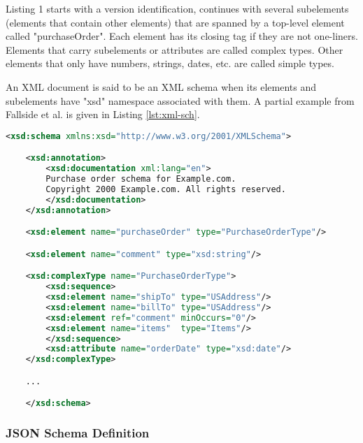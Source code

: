 Listing 1 starts with a version identification, continues with several
subelements (elements that contain other elements) that are spanned by a
top-level element called "purchaseOrder". Each element has its closing tag if
they are not one-liners. Elements that carry subelements or attributes are
called complex types. Other elements that only have numbers, strings, dates,
etc. are called simple types.

An XML document is said to be an XML schema when its elements and subelements
have "xsd" namespace associated with them. A partial example from Fallside et
al. is given in Listing \ref{lst:xml-sch}.

\begin{lstlisting}[language = XML, caption = {A partial XML schema for a home products ordering and billing application.}, captionpos = b, label = lst:xml-sch]
    <xsd:schema xmlns:xsd="http://www.w3.org/2001/XMLSchema">

    <xsd:annotation>
        <xsd:documentation xml:lang="en">
        Purchase order schema for Example.com.
        Copyright 2000 Example.com. All rights reserved.
        </xsd:documentation>
    </xsd:annotation>

    <xsd:element name="purchaseOrder" type="PurchaseOrderType"/>

    <xsd:element name="comment" type="xsd:string"/>

    <xsd:complexType name="PurchaseOrderType">
        <xsd:sequence>
        <xsd:element name="shipTo" type="USAddress"/>
        <xsd:element name="billTo" type="USAddress"/>
        <xsd:element ref="comment" minOccurs="0"/>
        <xsd:element name="items"  type="Items"/>
        </xsd:sequence>
        <xsd:attribute name="orderDate" type="xsd:date"/>
    </xsd:complexType>

    ...

    </xsd:schema>

\end{lstlisting}

\subsubsection{JSON Schema Definition}